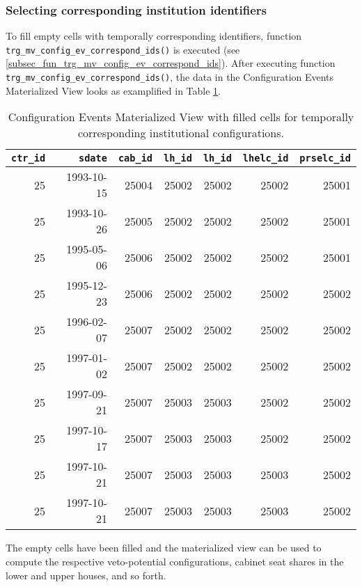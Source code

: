 \subsubsection{Selecting corresponding institution identifiers}

To fill empty cells with temporally corresponding identifiers, function \texttt{trg\_mv\_config\_ev\_correspond\_ids()} is executed (see \ref{subsec_fun_trg_mv_config_ev_correspond_ids}).
After executing function \texttt{trg\_mv\_config\_ev\_correspond\_ids()}, the data in the Configuration Events Materialized View looks as examplified in Table \ref{tab_mview_config_events_filled_cells}.

\begin{table}[h!]
\centering\footnotesize
\caption{Configuration Events Materialized View with filled cells for temporally corresponding institutional configurations.}
\label{tab_mview_config_events_filled_cells}
\begin{tabular}{r r r r r r r}
\tabularnewline\toprule\toprule
\multicolumn{1}{r}{\texttt{ctr\_id}}	&
\multicolumn{1}{r}{\texttt{sdate}}	&	
\multicolumn{1}{r}{\texttt{cab\_id}}	&
\multicolumn{1}{r}{\texttt{lh\_id}}	&
\multicolumn{1}{r}{\texttt{lh\_id}}	&	
\multicolumn{1}{r}{\texttt{lhelc\_id}}	&	
\multicolumn{1}{r}{\texttt{prselc\_id}}	\\\midrule
25	&	1993-10-15	&	25004	&	25002	&	25002	&	25002	&	25001	\\
25	&	1993-10-26	&	25005	&	25002	&	25002	&	25002	&	25001	\\
25	&	1995-05-06	&	25006	&	25002	&	25002	&	25002	&	25001	\\
25	&	1995-12-23	&	25006	&	25002	&	25002	&	25002	&	25002	\\
25	&	1996-02-07	&	25007	&	25002	&	25002	&	25002	&	25002	\\
25	&	1997-01-02	&	25007	&	25002	&	25002	&	25002	&	25002	\\
25	&	1997-09-21	&	25007	&	25003	&	25003	&	25002	&	25002	\\
25	&	1997-10-17	&	25007	&	25003	&	25003	&	25002	&	25002	\\
25	&	1997-10-21	&	25007	&	25003	&	25003	&	25003	&	25002	\\
25	&	1997-10-21	&	25007	&	25003	&	25003	&	25003	&	25002	\\\bottomrule\bottomrule
\end{tabular}
\end{table}

The empty cells have been filled and the materialized view can be used to compute the respective veto-potential configurations, cabinet seat shares in the lower and upper houses, and so forth.


